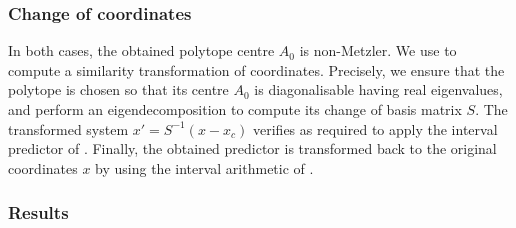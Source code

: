 \subsubsection{Change of coordinates}
In both cases, the obtained polytope centre $A_0$ is non-Metzler.
We use  to compute a similarity transformation of coordinates. Precisely, we ensure that the polytope is chosen so that its centre $A_0$ is diagonalisable having real eigenvalues, and perform an eigendecomposition to compute its change of basis matrix $S$. The transformed system $x'=S^{-1}(x-x_c)$ verifies  as required to apply the interval predictor of . Finally, the obtained predictor is transformed back to the original coordinates $x$ by using the interval arithmetic of .

\subsubsection{Results}

